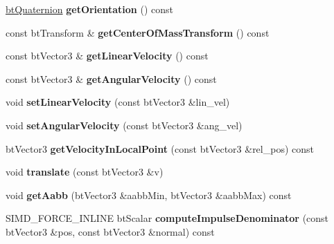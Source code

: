 \begin{DoxyCompactItemize}
\hyperlink{classbtQuaternion}{bt\+Quaternion} {\bfseries get\+Orientation} () const
\item 
\mbox{\label{classbtRigidBody_a999bf363587ede881dbe239e7d1e9bee}} 
const bt\+Transform \& {\bfseries get\+Center\+Of\+Mass\+Transform} () const
\item 
\mbox{\label{classbtRigidBody_a9a8c37d20a73d197e55a0a5ccc342815}} 
const bt\+Vector3 \& {\bfseries get\+Linear\+Velocity} () const
\item 
\mbox{\label{classbtRigidBody_a0f6b08909d7eab1fc105608b10fe4b90}} 
const bt\+Vector3 \& {\bfseries get\+Angular\+Velocity} () const
\item 
\mbox{\label{classbtRigidBody_ad692042edc901425189cf1d067eebac6}} 
void {\bfseries set\+Linear\+Velocity} (const bt\+Vector3 \&lin\+\_\+vel)
\item 
\mbox{\label{classbtRigidBody_ac6e5f94e998150e37ca8962c851d10a8}} 
void {\bfseries set\+Angular\+Velocity} (const bt\+Vector3 \&ang\+\_\+vel)
\item 
\mbox{\label{classbtRigidBody_a1b4cd79f5c8ad9161737742eea9470f5}} 
bt\+Vector3 {\bfseries get\+Velocity\+In\+Local\+Point} (const bt\+Vector3 \&rel\+\_\+pos) const
\item 
\mbox{\label{classbtRigidBody_aca945f8e257b617c5600e809f179a0bb}} 
void {\bfseries translate} (const bt\+Vector3 \&v)
\item 
\mbox{\label{classbtRigidBody_a00efe4219a990718835e0a7ada5a2b5d}} 
void {\bfseries get\+Aabb} (bt\+Vector3 \&aabb\+Min, bt\+Vector3 \&aabb\+Max) const
\item 
\mbox{\label{classbtRigidBody_a8637d220d3002af281bdb81d5bedc1ba}} 
S\+I\+M\+D\+\_\+\+F\+O\+R\+C\+E\+\_\+\+I\+N\+L\+I\+NE bt\+Scalar {\bfseries compute\+Impulse\+Denominator} (const bt\+Vector3 \&pos, const bt\+Vector3 \&normal) const
\item 
\mbox{\label{classbtRigidBody_a18731fc59583c19e42b63a4e5d150d7c}} 

\end{DoxyCompactItemize}
